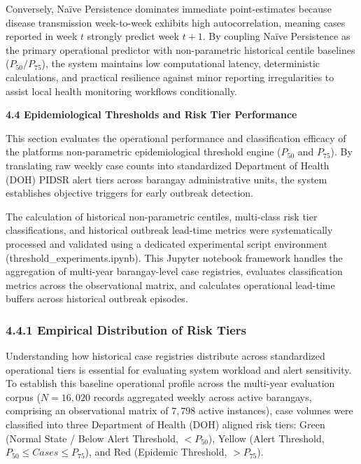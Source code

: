 \documentclass[
]{article}
\begin{document}
Conversely, Naïve Persistence dominates immediate point-estimates
because disease transmission week-to-week exhibits high autocorrelation,
meaning cases reported in week \(t\) strongly predict week \(t + 1\). By
coupling Naïve Persistence as the primary operational predictor with
non-parametric historical centile baselines (\(P_{50}/P_{75}\)), the
system maintains low computational latency, deterministic calculations,
and practical resilience against minor reporting irregularities to
assist local health monitoring workflows conditionally.

\textbf{4.4 Epidemiological Thresholds and Risk Tier Performance}

This section evaluates the operational performance and classification
efficacy of the platform\textquotesingle s non-parametric
epidemiological threshold engine (\(P_{50}\) and \(P_{75}\)). By
translating raw weekly case counts into standardized Department of
Health (DOH) PIDSR alert tiers across barangay administrative units, the
system establishes objective triggers for early outbreak detection.

The calculation of historical non-parametric centiles, multi-class risk
tier classifications, and historical outbreak lead-time metrics were
systematically processed and validated using a dedicated experimental
script environment (threshold\_experiments.ipynb). This Jupyter notebook
framework handles the aggregation of multi-year barangay-level case
registries, evaluates classification metrics across the observational
matrix, and calculates operational lead-time buffers across historical
outbreak episodes.

\subsubsection{\texorpdfstring{\textbf{4.4.1 Empirical Distribution of
Risk
Tiers}}{4.4.1 Empirical Distribution of Risk Tiers}}\label{empirical-distribution-of-risk-tiers}

Understanding how historical case registries distribute across
standardized operational tiers is essential for evaluating system
workload and alert sensitivity. To establish this baseline operational
profile across the multi-year evaluation corpus (\(N = 16,020\) records
aggregated weekly across active barangays, comprising an observational
matrix of \(7,798\) active instances), case volumes were classified into
three Department of Health (DOH) aligned risk tiers: Green (Normal State
/ Below Alert Threshold, \(< P_{50}\)), Yellow (Alert Threshold,
\(P_{50} \leq Cases \leq P_{75}\)), and Red (Epidemic Threshold,
\(> P_{75}\)).
\end{document}
